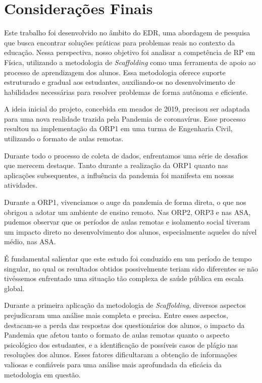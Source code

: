 \chapter{Considerações Finais} \label{ch:conclusao}

Este trabalho foi desenvolvido no âmbito do EDR, uma abordagem de pesquisa que busca encontrar soluções práticas para problemas reais no contexto da educação. Nessa perspectiva, nosso objetivo foi analisar a competência de RP em Física, utilizando a metodologia de \textit{Scaffolding} como uma ferramenta de apoio ao processo de aprendizagem dos alunos. Essa metodologia oferece suporte estruturado e gradual aos estudantes, auxiliando-os no desenvolvimento de habilidades necessárias para resolver problemas de forma autônoma e eficiente.

A ideia inicial do projeto, concebida em meados de 2019, precisou ser adaptada para uma nova realidade trazida pela Pandemia de coronavírus. Esse processo resultou na implementação da ORP1 em uma turma de Engenharia Civil, utilizando o formato de aulas remotas.

Durante todo o processo de coleta de dados, enfrentamos uma série de desafios que merecem destaque. Tanto durante a realização da ORP1 quanto nas aplicações subsequentes, a influência da pandemia foi manifesta em nossas atividades.

Durante a ORP1, vivenciamos o auge da pandemia de forma direta, o que nos obrigou a adotar um ambiente de ensino remoto. Nas ORP2, ORP3 e nas ASA, pudemos observar que os períodos de aulas remotas e isolamento social tiveram um impacto direto no desenvolvimento dos alunos, especialmente aqueles do nível médio, nas ASA.

É fundamental salientar que este estudo foi conduzido em um período de tempo singular, no qual os resultados obtidos possivelmente teriam sido diferentes se não tivéssemos enfrentado uma situação tão complexa de saúde pública em escala global.

Durante a primeira aplicação da metodologia de \textit{Scaffolding}, diversos aspectos prejudicaram uma análise mais completa e precisa. Entre esses aspectos, destacam-se a perda das respostas dos questionários dos alunos, o impacto da Pandemia que afetou tanto o formato de aulas remotas quanto o aspecto psicológico dos estudantes, e a identificação de possíveis casos de plágio nas resoluções dos alunos. Esses fatores dificultaram a obtenção de informações valiosas e confiáveis para uma análise mais aprofundada da eficácia da metodologia em questão.

